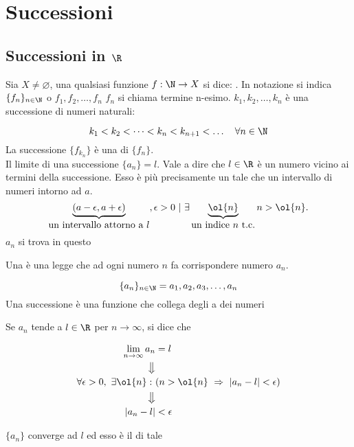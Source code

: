\documentclass[../appunti.tex]{subfiles}
\begin{document}
\section{Successioni}
\subsection{Successioni in $\R$}
Sia $X \neq \varnothing$, una qualsiasi funzione $f: \N \to X$ si dice: 
. \newline
In notazione si indica $ \{ f_n \}_{n \in \N} $ o $f_1, f_2, \dots , f_n $ \newline
$ f_n $ si chiama termine n-esimo. \newline
$ k_1, k_2, \dots , k_n $ è una successione di numeri naturali:

\begin{equation}
	k_1 < k_2 < \dots < k_n < k_{n+1} < \dots \quad \forall n \in \N
\end{equation}
La successione $ \{ f_{k_n} \} $ è una  di $ \{ f_n \} $.\\
Il limite di una successione $ \{ a_n \} = l $. Vale a dire che $ l \in \R $
è un numero vicino ai termini della successione. Esso è più precisamente un 
 tale che  un intervallo di numeri intorno
ad $a$.
\bda
\begin{equation}
	\underbrace{( a - \epsilon, a + \epsilon)}_{\mbox{un intervallo attorno a 
	$l$}} , \epsilon > 0\ |\ \exists 
	\underbrace{\ol{n}}_{\mbox{un indice $n$ t.c.}} n > \ol{n}.
\end{equation}
$a_n$ si trova in questo 

\begin{defn}[Successione]
Una  è una legge che ad ogni numero  $n$ 
fa corrispondere numero  $a_n$.

\begin{equation}
	\{ a_n \}_{n \in \N} = a_1, a_2, a_3, \dots , a_n
\end{equation}
Una successione è una funzione che collega degli  a dei numeri 
\end{defn}


\begin{defn}
Se $ a_n$ tende a $ l \in \R$ per $n \to \infty$, si dice che 


\begin{equation}
	\begin{aligned}
 	\lim \limits_{n \to \infty} a_n &= l\\
	\big\Downarrow\\
	\forall \epsilon > 0,\ \exists \ol{n}:\
	&( n > \ol{n}\ \Rightarrow\ | a_n - l | < \epsilon )\\
	\big\Downarrow\\
	| a_n - l | &< \epsilon
	\end{aligned}
\end{equation}

$ \{ a_n \} $ converge ad $l$ ed esso è il  di tale 
\end{defn}
\end{document}
